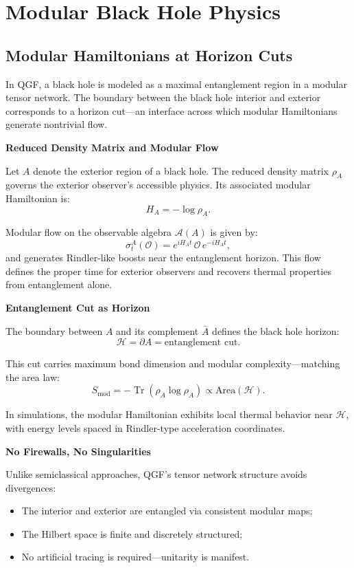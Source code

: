 \documentclass[11pt]{article}
\DeclareMathOperator*{\Tr}{Tr}
\begin{document}
\section{Modular Black Hole Physics}

\subsection{Modular Hamiltonians at Horizon Cuts}

In QGF, a black hole is modeled as a maximal entanglement region in a modular tensor network. The boundary between the black hole interior and exterior corresponds to a horizon cut—an interface across which modular Hamiltonians generate nontrivial flow.

\vspace{0.5em}
\noindent\textbf{Reduced Density Matrix and Modular Flow}

Let \( A \) denote the exterior region of a black hole. The reduced density matrix \( \rho_A \) governs the exterior observer’s accessible physics. Its associated modular Hamiltonian is:
\[
H_A = -\log \rho_A.
\]

Modular flow on the observable algebra \( \mathcal{A}(A) \) is given by:
\[
\sigma_t^A(\mathcal{O}) = e^{i H_A t} \, \mathcal{O} \, e^{-i H_A t},
\]
and generates Rindler-like boosts near the entanglement horizon. This flow defines the proper time for exterior observers and recovers thermal properties from entanglement alone.

\vspace{0.5em}
\noindent\textbf{Entanglement Cut as Horizon}

The boundary between \( A \) and its complement \( \bar{A} \) defines the black hole horizon:
\[
\mathcal{H} = \partial A = \text{entanglement cut}.
\]

This cut carries maximum bond dimension and modular complexity—matching the area law:
\[
S_{\text{mod}} = -\Tr(\rho_A \log \rho_A) \propto \text{Area}(\mathcal{H}).
\]

In simulations, the modular Hamiltonian exhibits local thermal behavior near \( \mathcal{H} \), with energy levels spaced in Rindler-type acceleration coordinates.

\vspace{0.5em}
\noindent\textbf{No Firewalls, No Singularities}

Unlike semiclassical approaches, QGF’s tensor network structure avoids divergences:
\begin{itemize}
  \item The interior and exterior are entangled via consistent modular maps;
  \item The Hilbert space is finite and discretely structured;
  \item No artificial tracing is required—unitarity is manifest.
\end{itemize}
\end{document}

